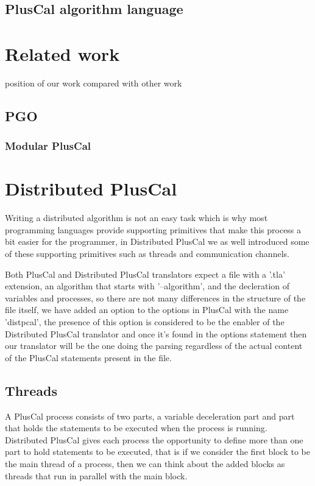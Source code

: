 \documentclass{thesul}
\begin{document}
\section{PlusCal algorithm language}
 

\chapter{Related work}
position of our work compared with other work

\section{PGO}

\subsection{Modular PlusCal}

\chapter{Distributed PlusCal}

Writing a distributed algorithm is not an easy task which is why most programming languages provide supporting primitives that make this process a bit easier for the programmer, in Distributed PlusCal we as well introduced some of these supporting primitives such as threads and communication channels.

Both PlusCal and Distributed PlusCal translators expect a file with a '.tla' extension, an algorithm that starts with '--algorithm', and the decleration of variables and processes, so there are not many differences in the structure of the file itself, we have added an option to the options in PlusCal with the name 'distpcal', the presence of this option is considered to be the enabler of the Distributed PlusCal translator and once it's found in the options statement then our translator will be the one doing the parsing regardless of the actual content of the PlusCal statements present in the file.

\section{Threads}

A PlusCal process consists of two parts, a variable deceleration part and part that holds the statements to be executed when the process is running.
Distributed PlusCal gives each process the opportunity to define more than one part to hold statements to be executed, that is if we consider the first   block to be the main thread of a process, then we can think about the added blocks as threads that run in parallel with the main block.
\end{document}

